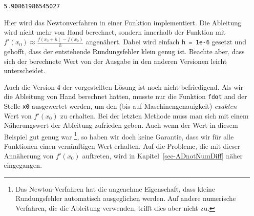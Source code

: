 \documentclass[
  letterpaper,
  DIV=11,
  oneside]{scrreprt}
\theoremstyle{definition}
\theoremstyle{definition}
\theoremstyle{remark}
\begin{document}
\begin{tcolorbox}
\begin{verbatim}
5.90861986545027
\end{verbatim}

Hier wird das Newtonverfahren in einer Funktion implementiert. Die
Ableitung wird nicht mehr von Hand berechnet, sondern innerhalb der
Funktion mit \(f'(x_0)\approx \frac{f(x_0 + h) - f(x_0)}{h}\)
angenähert. Dabei wird einfach \texttt{h\ =\ 1e-6} gesetzt und gehofft,
dass der entstehende Rundungsfehler klein genug ist. Beachte aber, dass
sich der berechnete Wert von der Ausgabe in den anderen Versionen leicht
unterscheidet.

\end{tcolorbox}

Auch die Version 4 der vorgestellten Lösung ist noch nicht befriedigend.
Als wir die Ableitung von Hand berechnet hatten, musste nur die Funktion
\texttt{fdot} and der Stelle \texttt{x0} ausgewertet werden, um den (bis
auf Maschinengenauigkeit) \emph{exakten} Wert von \(f'(x_0)\) zu
erhalten. Bei der letzten Methode muss man sich mit einem Näherungswert
der Ableitung zufrieden geben. Auch wenn der Wert in diesem Beispiel gut
genug war \footnote{Das Newton-Verfahren hat die angenehme Eigenschaft,
  dass kleine Rundungsfehler automatisch ausgeglichen werden. Auf andere
  numerische Verfahren, die die Ableitung verwenden, trifft dies aber
  nicht zu.}, so haben wir doch keine Garantie, dass wir für alle
Funktionen einen vernünftigen Wert erhalten. Auf die Probleme, die mit
dieser Annäherung von \(f'(x_0)\) auftreten, wird in
Kapitel~\ref{sec-ADnotNumDiff} näher eingegangen.
\end{document}
